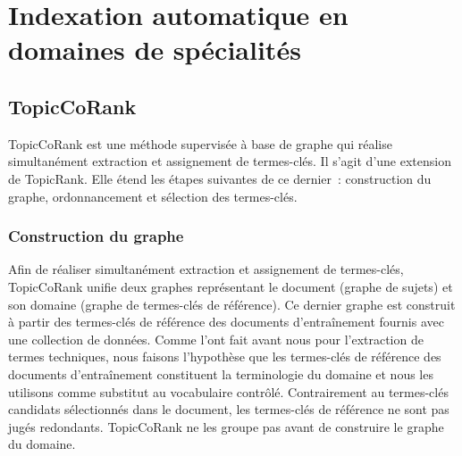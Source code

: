 
  \section{Indexation automatique en domaines de spécialités}
  \label{sec:main-domain_specific_keyphrase_annotation-supervised_automatic_keyphrase_extraction}
    \TODO{\dots}

    \subsection{TopicCoRank}
    \label{subsec:main-domain_specific_keyphrase_annotation-supervised_automatic_keyphrase_annotation-topiccorank}
      TopicCoRank est une méthode supervisée à base de graphe qui réalise
      simultanément extraction et assignement de termes-clés. Il s'agit d'une
      extension de TopicRank. Elle étend les étapes suivantes de ce dernier~:
      construction du graphe, ordonnancement et sélection des termes-clés.

      \subsubsection{Construction du graphe}
      \label{subsubsec:main-domain_specific_keyphrase_annotation-supervised_automatic_keyphrase_extraction-topiccorank-graph_construction}
        Afin de réaliser simultanément extraction et assignement de termes-clés,
        TopicCoRank unifie deux graphes représentant le document (graphe de
        sujets) et son domaine (graphe de termes-clés de référence). Ce dernier
        graphe est construit à partir des termes-clés de référence des documents
        d'entraînement fournis avec une collection de données. Comme
         l'ont fait avant nous
        pour l'extraction de termes techniques, nous faisons l'hypothèse que les
        termes-clés de référence des documents d'entraînement constituent la
        terminologie du domaine et nous les utilisons comme substitut au
        vocabulaire contrôlé. Contrairement au termes-clés candidats
        sélectionnés dans le document, les termes-clés de référence ne sont pas
        jugés redondants. TopicCoRank ne les groupe pas avant de construire le
        graphe du domaine.

